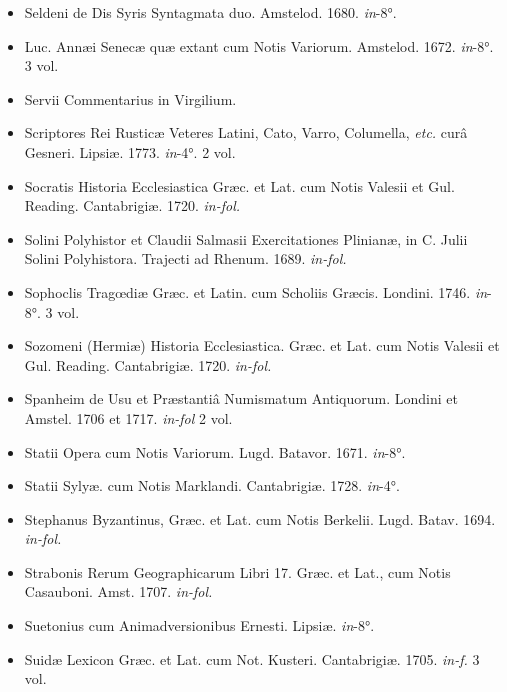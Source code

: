 \documentclass[a4paper, 11pt, oneside, polutonikogreek, french]{article}
\begin{document}
\begin{itemize}
    \item Seldeni de Dis Syris Syntagmata duo. Amstelod. 1680. \emph{in}-8°.

    \item Luc. Annæi Senecæ quæ extant cum Notis Variorum. Amstelod. 1672. \emph{in}-8°. 3 vol.

    \item Servii Commentarius in Virgilium.

    \item Scriptores Rei Rusticæ Veteres Latini, Cato, Varro, Columella, \emph{etc.} curâ Gesneri. Lipsiæ. 1773. \emph{in}-4°. 2 vol.

    \item Socratis Historia Ecclesiastica Græc. et Lat. cum Notis Valesii et Gul. Reading. Cantabrigiæ. 1720. \emph{in-fol.}

    \item Solini Polyhistor et Claudii Salmasii Exercitationes Plinianæ, in C. Julii Solini Polyhistora. Trajecti ad Rhenum. 1689. \emph{in-fol.}

    \item Sophoclis Tragœdiæ Græc. et Latin. cum Scholiis Græcis. Londini. 1746. \emph{in}-8°. 3 vol.

    \item Sozomeni (Hermiæ) Historia Ecclesiastica. Græc. et Lat. cum Notis Valesii et Gul. Reading. Cantabrigiæ. 1720. \emph{in-fol.}

    \item Spanheim de Usu et Præstantiâ Numismatum Antiquorum. Londini et Amstel. 1706 et 1717. \emph{in-fol} 2 vol.

    \item Statii Opera cum Notis Variorum. Lugd. Batavor. 1671. \emph{in}-8°.

    \item Statii Sylyæ. cum Notis Marklandi. Cantabrigiæ. 1728. \emph{in}-4°.

    \item Stephanus Byzantinus, Græc. et Lat. cum Notis Berkelii. Lugd. Batav. 1694. \emph{in-fol.}

    \item Strabonis Rerum Geographicarum Libri 17. Græc. et Lat., cum Notis Casauboni. Amst. 1707. \emph{in-fol.}

    \item Suetonius cum Animadversionibus Ernesti. Lipsiæ. \emph{in}-8°.

    \item Suidæ Lexicon Græc. et Lat. cum Not. Kusteri. Cantabrigiæ. 1705. \emph{in-f.} 3 vol.


\end{itemize}
\end{document}
